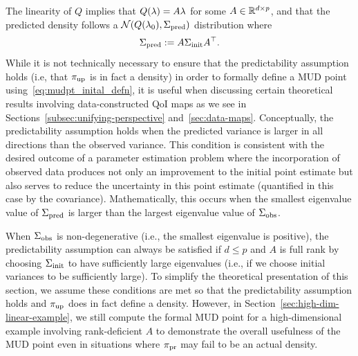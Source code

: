 The linearity of $Q$ implies that $Q(\lambda)=A\lambda$ for some $A\in\mathbb{R}^{d\times p}$, and that the predicted density follows a $\mathcal{N}(Q(\lambda_0), \Sigma_\text{pred})$ distribution where
\begin{equation}\label{eq:predictCov}
	\Sigma_\text{pred} := A\Sigma_\text{init} A^\top.
\end{equation}
While it is not technically necessary to ensure that the predictability assumption holds (i.e, that $\operatorname*{\pi_{up}}$ is in fact a density) in order to formally define a MUD point using~\eqref{eq:mudpt_inital_defn}, it is useful when discussing certain theoretical results involving data-constructed QoI maps as we see in Sections~\ref{subsec:unifying-perspective} and~\ref{sec:data-maps}.
Conceptually, the predictability assumption holds when the predicted variance is larger in all directions than the observed variance.
This condition is consistent with the desired outcome of a parameter estimation problem where the incorporation of observed data produces not only an improvement to the initial point estimate but also serves to reduce the uncertainty in this point estimate (quantified in this case by the covariance).
Mathematically, this occurs when the smallest eigenvalue value of $\Sigma_\text{pred}$ is larger than the largest eigenvalue value of $\Sigma_\text{obs}$.

When $\Sigma_\text{obs}$ is non-degenerative (i.e., the smallest eigenvalue is positive), the predictability assumption can always be satisfied if $d\leq p$ and $A$ is full rank by choosing $\Sigma_\text{init}$ to have sufficiently large eigenvalues (i.e., if we choose initial variances to be sufficiently large).
To simplify the theoretical presentation of this section, we assume these conditions are met so that the predictability assumption holds and $\operatorname*{\pi_{up}}$ does in fact define a density.
However, in Section~\ref{sec:high-dim-linear-example}, we still compute the formal MUD point for a high-dimensional example involving rank-deficient $A$ to demonstrate the overall usefulness of the MUD point even in situations where $\operatorname*{\pi_{pr}}$ may fail to be an actual density.

